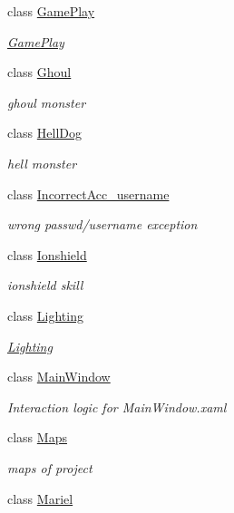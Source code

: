\begin{DoxyCompactItemize}
class \hyperlink{class_lightdeath_1_1_game_play}{Game\+Play}
\begin{DoxyCompactList}\small\item\em \hyperlink{class_lightdeath_1_1_game_play}{Game\+Play} \end{DoxyCompactList}\item 
class \hyperlink{class_lightdeath_1_1_ghoul}{Ghoul}
\begin{DoxyCompactList}\small\item\em ghoul monster \end{DoxyCompactList}\item 
class \hyperlink{class_lightdeath_1_1_hell_dog}{Hell\+Dog}
\begin{DoxyCompactList}\small\item\em hell monster \end{DoxyCompactList}\item 
class \hyperlink{class_lightdeath_1_1_incorrect_acc__username}{Incorrect\+Acc\+\_\+username}
\begin{DoxyCompactList}\small\item\em wrong passwd/username exception \end{DoxyCompactList}\item 
class \hyperlink{class_lightdeath_1_1_ionshield}{Ionshield}
\begin{DoxyCompactList}\small\item\em ionshield skill \end{DoxyCompactList}\item 
class \hyperlink{class_lightdeath_1_1_lighting}{Lighting}
\begin{DoxyCompactList}\small\item\em \hyperlink{class_lightdeath_1_1_lighting}{Lighting} \end{DoxyCompactList}\item 
class \hyperlink{class_lightdeath_1_1_main_window}{Main\+Window}
\begin{DoxyCompactList}\small\item\em Interaction logic for Main\+Window.\+xaml \end{DoxyCompactList}\item 
class \hyperlink{class_lightdeath_1_1_maps}{Maps}
\begin{DoxyCompactList}\small\item\em maps of project \end{DoxyCompactList}\item 
class \hyperlink{class_lightdeath_1_1_mariel}{Mariel}

\end{DoxyCompactItemize}
